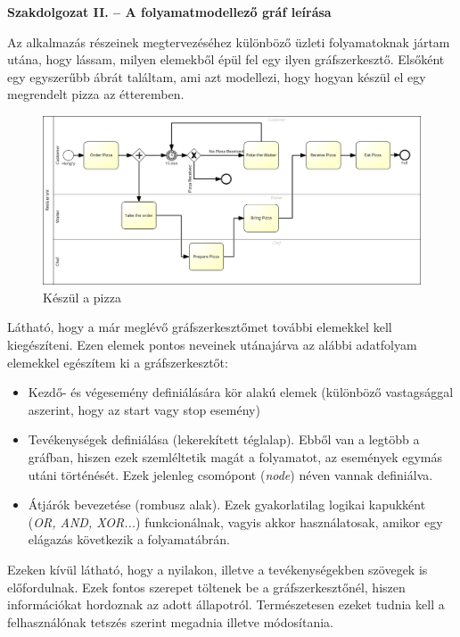 \documentclass[a4paper]{article}
\begin{document}
\noindent \textbf{Szakdolgozat II. -- A folyamatmodellező gráf leírása}

\vskip 8mm

Az alkalmazás részeinek megtervezéséhez különböző üzleti folyamatoknak jártam utána, hogy lássam, milyen elemekből épül fel egy ilyen gráfszerkesztő. Elsőként egy egyszerűbb ábrát találtam, ami azt modellezi, hogy hogyan készül el egy megrendelt pizza az étteremben.

\begin{figure}[h]
\centering
\includegraphics[width=16truecm]{pizzarest.png}
\caption{Készül a pizza}
\end{figure}

Látható, hogy a már meglévő gráfszerkesztőmet további elemekkel kell kiegészíteni. Ezen elemek pontos neveinek utánajárva az alábbi adatfolyam elemekkel egészítem ki a gráfszerkesztőt:
\begin{itemize}
\item Kezdő- és végesemény definiálására kör alakú elemek (különböző vastagsággal aszerint, hogy az start vagy stop esemény)
\item Tevékenységek definiálása (lekerekített téglalap). Ebből van a legtöbb a gráfban, hiszen ezek szemléltetik magát a folyamatot, az események egymás utáni történését. Ezek jelenleg csomópont (\textit{node}) néven vannak definiálva.
\item Átjárók bevezetése (rombusz alak). Ezek gyakorlatilag logikai kapukként (\textit{OR, AND, XOR...}) funkcionálnak, vagyis akkor használatosak, amikor egy elágazás következik a folyamatábrán.
\end{itemize}

Ezeken kívül látható, hogy a nyilakon, illetve a tevékenységekben szövegek is előfordulnak. Ezek fontos szerepet töltenek be a gráfszerkesztőnél, hiszen információkat hordoznak az adott állapotról. Természetesen ezeket tudnia kell a felhasználónak tetszés szerint megadnia illetve módosítania.
\end{document}
